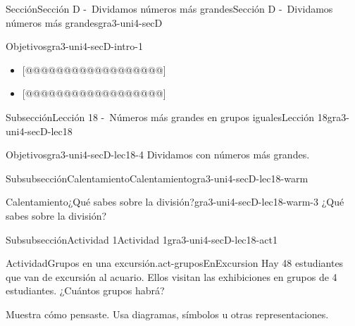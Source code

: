 \documentclass[twoside,10pt,]{article}
\begin{document}
\begin{sectionptx}{Sección}{Sección D -~Dividamos números más grandes}{}{Sección D -~Dividamos números más grandes}{}{}{gra3-uni4-secD}
\begin{introduction}{}%
\begin{objectives}{Objetivos}{gra3-uni4-secD-intro-1}
%
\begin{itemize}[label=\textbullet]
\item{}[@@@@@@@@@@@@@@@@@@]%
\item{}[@@@@@@@@@@@@@@@@@@]%
\end{itemize}
\end{objectives}
\end{introduction}%
%
%
\typeout{************************************************}
\typeout{************************************************}
%
\begin{subsectionptx}{Subsección}{Lección 18 -~Números más grandes en grupos iguales}{}{Lección 18}{}{}{gra3-uni4-secD-lec18}
\begin{objectives}{Objetivos}{gra3-uni4-secD-lec18-4}
Dividamos con números más grandes.%
\end{objectives}
%
%
\typeout{************************************************}
\typeout{************************************************}
%
\begin{subsubsectionptx}{Subsubsección}{Calentamiento}{}{Calentamiento}{}{}{gra3-uni4-secD-lec18-warm}
\begin{exploration}{Calentamiento}{¿Qué sabes sobre la división?}{gra3-uni4-secD-lec18-warm-3}%
¿Qué sabes sobre la división?%
\end{exploration}%
\end{subsubsectionptx}
%
%
\typeout{************************************************}
\typeout{************************************************}
%
\begin{subsubsectionptx}{Subsubsección}{Actividad 1}{}{Actividad 1}{}{}{gra3-uni4-secD-lec18-act1}
\begin{activity}{Actividad}{Grupos en una excursión.}{act-gruposEnExcursion}%
Hay 48 estudiantes que van de excursión al acuario. Ellos visitan las exhibiciones en grupos de 4 estudiantes. ¿Cuántos grupos habrá?%
\par
Muestra cómo pensaste. Usa diagramas, símbolos u otras representaciones.%
\begin{image}{0.15}{0.7}{0.15}{}%

\end{image}
\end{activity}
\end{subsubsectionptx}
\end{subsectionptx}
\end{sectionptx}
\end{document}
